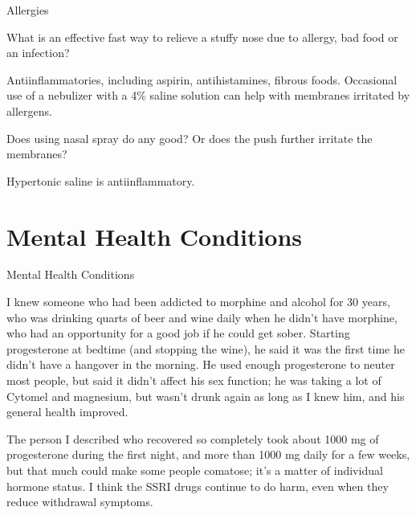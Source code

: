 \documentclass[11pt,oneside,openany,extrafontsizes]{memoir}
\begin{document}
\begin{emailexchange}{Allergies}

    \begin{question}
        What is an effective fast way to relieve a stuffy nose due to allergy, bad food or an infection?
    \end{question}

    \begin{answer}
      Antiinflammatories, including aspirin, antihistamines, fibrous foods. Occasional use of a nebulizer with a 4\% saline solution can help with membranes irritated by allergens.
    \end{answer}

    \begin{question}
        Does using nasal spray do any good? Or does the push further irritate the membranes?
    \end{question}

    \begin{answer}
      Hypertonic saline is antiinflammatory.
    \end{answer}
\end{emailexchange}

\section{Mental Health Conditions}

\begin{standalonequote}{Mental Health Conditions}

    \begin{answer}
        I knew someone who had been addicted to morphine and alcohol for 30 years, who was drinking quarts of beer and wine daily when he didn't have morphine, who had an opportunity for a good job if he could get sober. Starting progesterone at bedtime (and stopping the wine), he said it was the first time he didn't have a hangover in the morning. He used enough progesterone to neuter most people, but said it didn't affect his sex function; he was taking a lot of Cytomel and magnesium, but wasn't drunk again as long as I knew him, and his general health improved.

        The person I described who recovered so completely took about 1000 mg of progesterone during the first night, and more than 1000 mg daily for a few weeks, but that much could make some people comatose; it's a matter of individual hormone status. I think the SSRI drugs continue to do harm, even when they reduce withdrawal symptoms.
    \end{answer}
\end{standalonequote}
\end{document}
